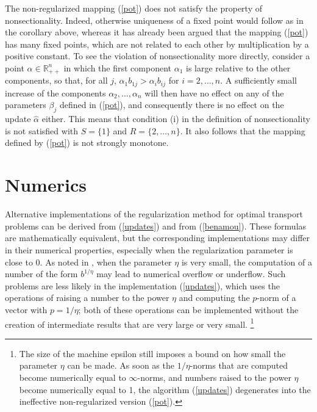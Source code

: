 \documentclass{article}
\newcommand{\mR}{\mathbb{R}}
\theoremstyle{definition}
\renewcommand{\baselinestretch}{1.5}
\let\origfootnote\footnote
\renewcommand{\footnote}[1]{%
   \begingroup
   \renewcommand{\baselinestretch}{1}%
   \origfootnote{#1}%
   \endgroup}
\begin{document}
The non-regularized mapping (\ref{pot}) does not satisfy the property of nonsectionality. Indeed, otherwise uniqueness of a fixed point would follow as in the corollary above, whereas it has already been argued that the mapping (\ref{pot}) has many fixed points, which are not related to each other by multiplication by a positive constant. To see the violation of nonsectionality more directly, consider a point $\alpha \in \mR_{++}^n$ in which the first component $\alpha_1$ is large relative to the other components, so that, for all $j$, $\alpha_1 b_{1j} > \alpha_i b_{ij}$ for $i=2,\dots,n$. A sufficiently small increase of the components $\alpha_2,\dots,\alpha_n$ will then have no effect on any of the parameters $\beta_j$ defined in (\ref{pot}), and consequently there is no effect on the update $\hat{\alpha}$ either. This means that condition (i) in the definition of nonsectionality is not satisfied with $S=\{1\}$ and $R=\{2,\dots,n\}$. It also follows that the mapping defined by (\ref{pot}) is not strongly monotone.

\section{Numerics} \label{numerics}

Alternative implementations of the regularization method for optimal transport problems can be derived from (\ref{updates})
and from (\ref{benamou}). These formulas are mathematically equivalent, but the corresponding implementations may differ
in their numerical properties, especially when the regularization parameter is close to 0.
As noted in \cite{Benamou}, when the parameter $\eta$ is very small, the computation of a number of the form $b^{1/\eta}$ may lead to numerical overflow or underflow. Such problems are less likely in the implementation (\ref{updates}), which uses the operations of raising a number to the power $\eta$ and computing the $p$-norm of a vector with $p=1/\eta$; both of these operations can be implemented without the creation of intermediate results that are very large or very small.\footnote{The size of the machine epsilon still imposes a bound on how small the parameter $\eta$ can be made. As soon as the $1/\eta$-norms that are computed become numerically equal to $\infty$-norms, and numbers raised to the power $\eta$ become numerically equal to 1, the algorithm (\ref{updates}) degenerates into the ineffective non-regularized version (\ref{pot}).}
\end{document}
